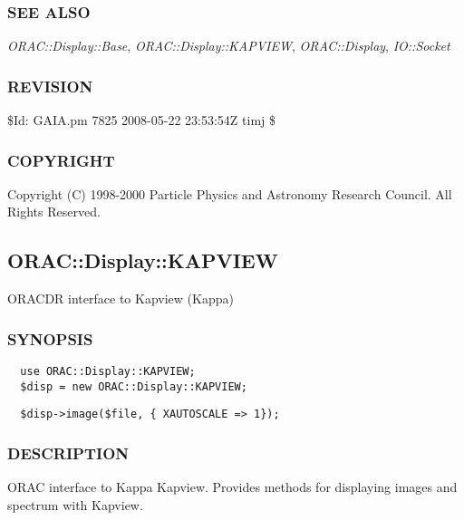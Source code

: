 \subsubsection*{SEE ALSO\label{ORAC::Display::GAIA_SEE_ALSO}}


\emph{ORAC::Display::Base}, \emph{ORAC::Display::KAPVIEW}, \emph{ORAC::Display},
\emph{IO::Socket}

\subsubsection*{REVISION\label{ORAC::Display::GAIA_REVISION}}


\$Id: GAIA.pm 7825 2008-05-22 23:53:54Z timj \$

\subsubsection*{COPYRIGHT\label{ORAC::Display::GAIA_COPYRIGHT}}


Copyright (C) 1998-2000 Particle Physics and Astronomy Research
Council. All Rights Reserved.

\subsection{ORAC::Display::KAPVIEW\label{ORAC::Display::KAPVIEW}}


ORACDR interface to Kapview (Kappa)

\subsubsection*{SYNOPSIS\label{ORAC::Display::KAPVIEW_SYNOPSIS}}
\begin{verbatim}
  use ORAC::Display::KAPVIEW;
  $disp = new ORAC::Display::KAPVIEW;
\end{verbatim}
\begin{verbatim}
  $disp->image($file, { XAUTOSCALE => 1});
\end{verbatim}
\subsubsection*{DESCRIPTION\label{ORAC::Display::KAPVIEW_DESCRIPTION}}


ORAC interface to Kappa Kapview. Provides methods for displaying images
and spectrum with Kapview.



